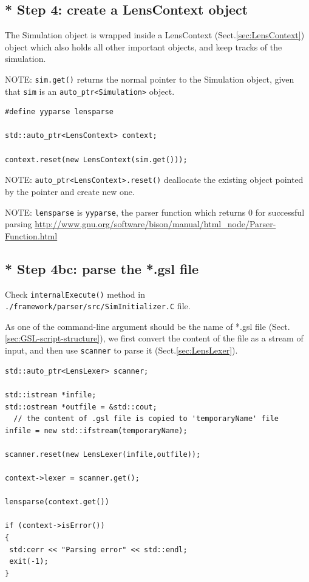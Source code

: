 \subsection{* Step 4: create a LensContext object}

The Simulation object is wrapped inside a LensContext
(Sect.\ref{sec:LensContext}) object which also holds all other important
objects, and keep tracks of the simulation.

NOTE: \verb!sim.get()! returns the normal pointer to the Simulation object,
given that \verb!sim! is an \verb!auto_ptr<Simulation>! object.

\begin{lstlisting}
#define yyparse lensparse

std::auto_ptr<LensContext> context;

context.reset(new LensContext(sim.get()));                                                                                                                                                        

\end{lstlisting}

NOTE: \verb!auto_ptr<LensContext>.reset()! deallocate the existing object
pointed by the pointer and create new one.

NOTE: \verb!lensparse! is \verb!yyparse!, the parser function which returns 0
for successful parsing
\url{http://www.gnu.org/software/bison/manual/html_node/Parser-Function.html}

\subsection{* Step 4bc: parse the *.gsl file}
\label{sec:parse-gsl-file}

Check \verb!internalExecute()! method in
\verb!./framework/parser/src/SimInitializer.C! file.


As one of the command-line argument should be the name of *.gsl file
(Sect.\ref{sec:GSL-script-structure}), we first convert the content of
the file as a stream of input, and then use \verb!scanner! to parse it
(Sect.\ref{sec:LensLexer}).

\begin{verbatim}
std::auto_ptr<LensLexer> scanner;

std::istream *infile;
std::ostream *outfile = &std::cout;  
  // the content of .gsl file is copied to 'temporaryName' file
infile = new std::ifstream(temporaryName);
   
scanner.reset(new LensLexer(infile,outfile)); 

context->lexer = scanner.get();

lensparse(context.get())

if (context->isError())
{
 std:cerr << "Parsing error" << std::endl;
 exit(-1);
}
\end{verbatim}


